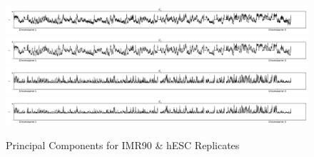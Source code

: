 \begin{figure}[H]
  \centering
  \caption{Principal Components for IMR90 \& hESC Replicates}
  \includegraphics[width=\textwidth]{./figures/supplementary/components/hESC-R1.png}
  \vfill
  \includegraphics[width=\textwidth]{./figures/supplementary/components/hESC-R2.png}
  \vfill
  \includegraphics[width=\textwidth]{./figures/supplementary/components/IMR90-R1.png}
  \vfill
  \includegraphics[width=\textwidth]{./figures/supplementary/components/IMR90-R2.png}
\end{figure}
